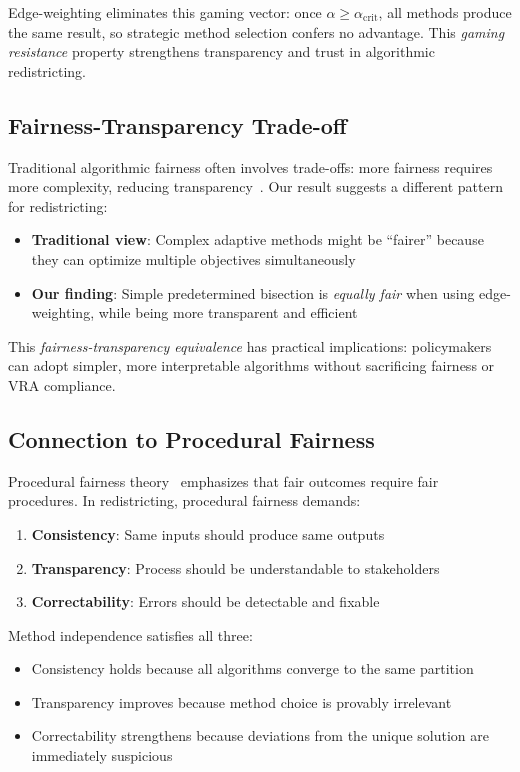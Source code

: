 Edge-weighting eliminates this gaming vector: once $\alpha \geq \alpha_{\text{crit}}$, all methods produce the same result, so strategic method selection confers no advantage. This \textit{gaming resistance} property strengthens transparency and trust in algorithmic redistricting.

\subsection{Fairness-Transparency Trade-off}

Traditional algorithmic fairness often involves trade-offs: more fairness requires more complexity, reducing transparency~\cite{lipton2018mythos}. Our result suggests a different pattern for redistricting:

\begin{itemize}
    \item \textbf{Traditional view}: Complex adaptive methods might be ``fairer'' because they can optimize multiple objectives simultaneously
    \item \textbf{Our finding}: Simple predetermined bisection is \textit{equally fair} when using edge-weighting, while being more transparent and efficient
\end{itemize}

This \textit{fairness-transparency equivalence} has practical implications: policymakers can adopt simpler, more interpretable algorithms without sacrificing fairness or VRA compliance.

\subsection{Connection to Procedural Fairness}

Procedural fairness theory~\cite{rawls1971theory,leventhal1980fairness} emphasizes that fair outcomes require fair procedures. In redistricting, procedural fairness demands:

\begin{enumerate}
    \item \textbf{Consistency}: Same inputs should produce same outputs
    \item \textbf{Transparency}: Process should be understandable to stakeholders
    \item \textbf{Correctability}: Errors should be detectable and fixable
\end{enumerate}

Method independence satisfies all three:
\begin{itemize}
    \item Consistency holds because all algorithms converge to the same partition
    \item Transparency improves because method choice is provably irrelevant
    \item Correctability strengthens because deviations from the unique solution are immediately suspicious
\end{itemize}

